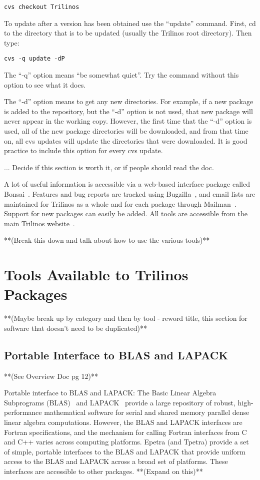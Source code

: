 \documentclass[12pt,relax]{TrilinosDevGuide}
\begin{document}
\begin{verbatim}
cvs checkout Trilinos
\end{verbatim}

To update after a version has been obtained use the ``update'' command.  
First, cd to the directory that is to be updated (usually the Trilinos root 
directory).  Then type:

\begin{verbatim}
cvs -q update -dP
\end{verbatim}

The ``-q'' option means ``be somewhat quiet''.  Try the command without this
option to see what it does.  

The ``-d'' option means to get any new directories.  For example, if a new 
package is added to the repository, but the ``-d'' option is not used, that 
new package will never appear in the working copy.  However, the first time 
that the ``-d'' option is used, all of the new package directories will be 
downloaded, and from that time on, all cvs updates will update the 
directories that were downloaded.  It is good practice to include this 
option for every cvs update.

... Decide if this section is worth it, or if people should read the doc.

A lot of useful information is accessible via a
web-based interface package called Bonsai~\cite{Bonsai}.  Features and bug 
reports are tracked using Bugzilla~\cite{Bugzilla}, and email lists are
maintained for Trilinos as a whole and for each package through 
Mailman~\cite{Mailman}.  Support for new packages can easily be added.  All 
tools are accessible from the main Trilinos website~\cite{Trilinos-home-page}.


**(Break this down and talk about how to use the various tools)**

	\chapter{Tools Available to Trilinos Packages}
	**(Maybe break up by category and then by tool - reword title, this section for software that doesn't need to be duplicated)**
	\section{Portable Interface to BLAS and LAPACK}
	**(See Overview Doc pg 12)**

Portable interface to BLAS and LAPACK: The Basic Linear Algebra
Subprograms (BLAS)~\cite{BLAS1,BLAS2,BLAS3} and LAPACK~\cite{lapack}
provide a large repository of robust, high-performance mathematical
software for serial and shared memory parallel dense linear algebra
computations.  However, the BLAS and LAPACK interfaces are Fortran
specifications, and the mechanism for calling Fortran interfaces from
C and C++ varies across computing platforms.  Epetra (and Tpetra)
provide a set of simple, portable interfaces to the BLAS and LAPACK
that provide uniform access to the BLAS and LAPACK across a broad
set of platforms.  These interfaces are accessible to
other packages.
**(Expand on this)**
\end{document}
